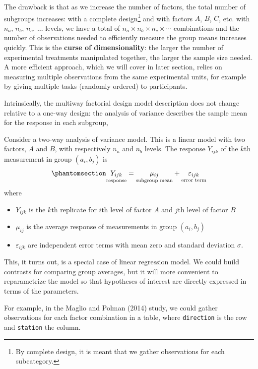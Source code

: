 \documentclass[
  11pt,
  letterpaper,
]{scrbook}
\providecommand{\tightlist}{%
  \setlength{\itemsep}{0pt}\setlength{\parskip}{0pt}}\usepackage{longtable,booktabs,array}
\theoremstyle{definition}
\theoremstyle{definition}
\theoremstyle{remark}
\begin{document}
The drawback is that as we increase the number of factors, the total
number of subgroups increases: with a complete design\footnote{By
  complete design, it is meant that we gather observations for each
  subcategory.} and with factors \(A\), \(B\), \(C\), etc. with \(n_a\),
\(n_b\), \(n_c\), \(\ldots\) levels, we have a total of
\(n_a\times n_b \times n_c \times \cdots\) combinations and the number
of observations needed to efficiently measure the group means increases
quickly. This is the \textbf{curse of dimensionality}: the larger the
number of experimental treatments manipulated together, the larger the
sample size needed. A more efficient approach, which we will cover in
later section, relies on measuring multiple observations from the same
experimental units, for example by giving multiple tasks (randomly
ordered) to participants.

Intrinsically, the multiway factorial design model description does not
change relative to a one-way design: the analysis of variance describes
the sample mean for the response in each subgroup,

Consider a two-way analysis of variance model. This is a linear model
with two factors, \(A\) and \(B\), with respectively \(n_a\) and \(n_b\)
levels. The response \(Y_{ijk}\) of the \(k\)th measurement in group
\((a_i, b_j)\) is
\begin{equation}\phantomsection\label{eq-twowayasoneway}{
\underset{\text{response}\vphantom{b}}{Y_{ijk}} = \underset{\text{subgroup mean}}{\mu_{ij}} + \underset{\text{error term}}{\varepsilon_{ijk}}
}\end{equation} where

\begin{itemize}
\tightlist
\item
  \(Y_{ijk}\) is the \(k\)th replicate for \(i\)th level of factor \(A\)
  and \(j\)th level of factor \(B\)
\item
  \(\mu_{ij}\) is the average response of measurements in group
  \((a_i, b_j)\)
\item
  \(\varepsilon_{ijk}\) are independent error terms with mean zero and
  standard deviation \(\sigma\).
\end{itemize}

This, it turns out, is a special case of linear regression model. We
could build contrasts for comparing group averages, but it will more
convenient to reparametrize the model so that hypotheses of interest are
directly expressed in terms of the parameters.

For example, in the Maglio and Polman (2014) study, we could gather
observations for each factor combination in a table, where
\texttt{direction} is the row and \texttt{station} the column.
\end{document}
